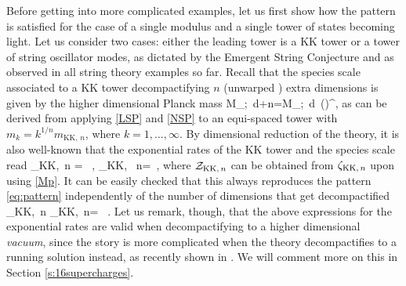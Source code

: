 Before getting into more complicated examples, let us first show how the pattern is satisfied for the case of a single modulus and a single tower of states becoming light. Let us consider two cases: either the leading tower is a KK tower or a tower of string oscillator modes, as dictated by the Emergent String Conjecture and as observed in all string theory examples so far. %
Recall that the species scale associated to a KK tower decompactifying $n$ (unwarped%
) extra  dimensions  is given by the higher dimensional Planck mass
%
\beq
\label{Mp}
	\LSP\equiv M_{;\, d+n}=M_{;\, d}\, \left(\right)^{},
\eeq
%
as can be derived from applying \eqref{LSP} and \eqref{NSP} to an equi-spaced tower with $m_k=k^{1/n} m_{\text{KK},\, n}$, where $k=1,\ldots,\infty$. By dimensional reduction of the theory, it is also well-known that the exponential rates of the KK tower and the species scale read
%
\beq\label{eq:zeta&speciesveconemodulus}
	\zeta_{{\rm KK},\, n} = \, , \qquad {}_{{\rm KK}, \, n}=\, ,
\eeq
%
where $\mathcal{Z}_{{\rm KK}, \, n}$ can be obtained from $\zeta_{{\rm KK},\, n}$ upon using \eqref{Mp}. It can be easily checked that this always reproduces the pattern \eqref{eq:pattern} independently of the number of dimensions that get decompactified
%
\beq\label{eq:patternKKn}
	\zeta_{{\rm KK},\, n} \cdot {}_{{\rm KK},\, n}= \, .
\eeq
%
Let us remark, though, that the above expressions for the exponential rates are valid when decompactifying to a higher dimensional \emph{vacuum}, since the story is more complicated when the theory decompactifies to a running solution instead, as recently shown in \cite{Etheredge:2023odp}. We will comment more on this in Section \ref{s:16supercharges}. 
	
